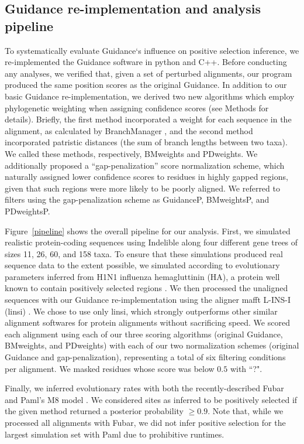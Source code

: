\documentclass[10pt]{article}
\begin{document}
\subsection*{Guidance re-implementation and analysis pipeline}
To systematically evaluate Guidance`s influence on positive selection inference, we re-implemented the Guidance software in python and C++. Before conducting any analyses, we verified that, given a set of perturbed alignments, our program produced the same position scores as the original Guidance. In addition to our basic Guidance re-implementation, we derived two new algorithms which employ phylogenetic weighting when assigning confidence scores (see Methods for details).  Briefly, the first method incorporated a weight for each sequence in the alignment, as calculated by BranchManager \citep{Stone2007}, and the second method incorporated patristic distances (the sum of branch lengths between two taxa). We called these methods, respectively, BMweights and PDweights.  We additionally proposed a ``gap-penalization” score normalization scheme, which naturally assigned lower confidence scores to residues in highly gapped regions, given that such regions were more likely to be poorly aligned. We referred to filters using the gap-penalization scheme as GuidanceP, BMweightsP, and PDweightsP.

Figure~\ref{pipeline} shows the overall pipeline for our analysis. First, we simulated realistic protein-coding sequences using Indelible \citep{Fletcher2009} along four different gene trees of sizes 11, 26, 60, and 158 taxa. To ensure that these simulations produced real sequence data to the extent possible, we simulated according to evolutionary parameters inferred from H1N1 influenza hemagluttinin (HA), a protein well known to contain positively selected regions \citep{Meyer2012}. We then processed the unaligned sequences with our Guidance re-implementation using the aligner mafft L-INS-I (linsi) \citep{Katoh2005}. We chose to use only linsi, which strongly outperforms other similar alignment softwares for protein alignments \citep{Thompson2011,Nuin2006}without sacrificing speed. We scored each alignment using each of our three scoring algorithms (original Guidance, BMweights, and PDweights) with each of our two normalization schemes (original Guidance and gap-penalization), representing a total of six filtering conditions per alignment. We masked residues whose score was below $0.5$ with ``?".  

Finally, we inferred evolutionary rates with both the recently-described Fubar \citep{Murrell2013} and Paml's M8 model \citep{Yang2007}. We considered sites as inferred to be positively selected if the given method returned a posterior probability $\geq0.9$. Note that, while we processed all alignments with Fubar, we did not infer positive selection for the largest simulation set with Paml due to prohibitive runtimes. 
\end{document}
